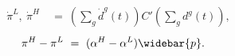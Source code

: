 \begin{equation}
\begin{split}
    \dot{\pi}^{L}, \ \dot{\pi}^{H} \
    & = \ \left( \sum_{g} \dot{d}^{g}(t) \right) C'\left( \sum_{g} d^{g}(t) \right),
\end{split}
\label{Equation:AKS-Style-Model_pi-dots}
\end{equation}
\begin{equation}
\begin{split}
    \pi^{H} - \pi^{L} \
    & = \ (\alpha^{H} - \alpha^{L}) \widebar{p}.
\end{split}
\label{Equation:AKS-Style-Model_difference-between-pis}
\end{equation}
